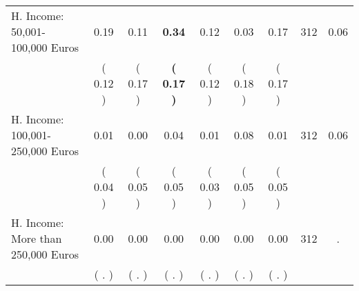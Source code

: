 \begin{tabular}{lcccccccc}
H. Income: 50,001-100,000 Euros &      0.19 &      0.11 & \textbf{     0.34} &      0.12 &      0.03 &      0.17 & 312 &       0.06 \\ 
 & (     0.12 ) & (     0.17 ) & \textbf{(     0.17 )} & (     0.12 ) & (     0.18 ) & (     0.17 ) & \\
H. Income: 100,001-250,000 Euros &      0.01 &      0.00 &      0.04 &      0.01 &      0.08 &      0.01 & 312 &       0.06 \\ 
 & (     0.04 ) & (     0.05 ) & (     0.05 ) & (     0.03 ) & (     0.05 ) & (     0.05 ) & \\
H. Income: More than 250,000 Euros &      0.00 &      0.00 &      0.00 &      0.00 &      0.00 &      0.00 & 312 &          . \\ 
 & (        . ) & (        . ) & (        . ) & (        . ) & (        . ) & (        . ) & \\
\bottomrule
\end{tabular}
